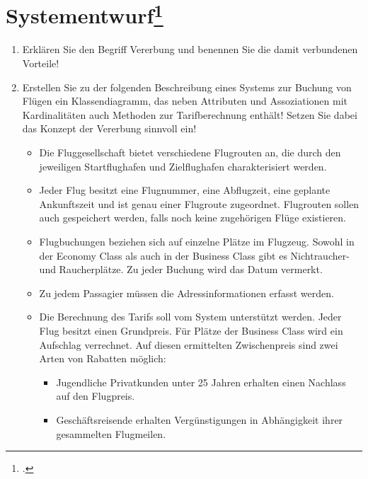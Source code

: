 \documentclass{lehramt-informatik}
\begin{document}
\section{Systementwurf\footcite{examen:66112:2006:09}}

\begin{enumerate}


\item Erklären Sie den Begriff Vererbung und benennen Sie die damit
verbundenen Vorteile!


\item Erstellen Sie zu der folgenden Beschreibung eines Systems zur
Buchung von Flügen ein Klassendiagramm, das neben Attributen und
Assoziationen mit Kardinalitäten auch Methoden zur Tarifberechnung
enthält! Setzen Sie dabei das Konzept der Vererbung sinnvoll ein!

\begin{itemize}
\item Die Fluggesellschaft bietet verschiedene Flugrouten an, die durch
den jeweiligen Startflughafen und Zielflughafen charakterisiert werden.

\item Jeder Flug besitzt eine Flugnummer, eine Abflugzeit, eine geplante
Ankunftszeit und ist genau einer Flugroute zugeordnet. Flugrouten sollen
auch gespeichert werden, falls noch keine zugehörigen Flüge existieren.

\item Flugbuchungen beziehen sich auf einzelne Plätze im Flugzeug.
Sowohl in der Economy Class als auch in der Business Class gibt es
Nichtraucher- und Raucherplätze. Zu jeder Buchung wird das Datum
vermerkt.

\item Zu jedem Passagier müssen die Adressinformationen erfasst werden.

\item Die Berechnung des Tarifs soll vom System unterstützt werden.
Jeder Flug besitzt einen Grundpreis. Für Plätze der Business Class wird
ein Aufschlag verrechnet. Auf diesen ermittelten Zwischenpreis sind zwei
Arten von Rabatten möglich:

\begin{itemize}
\item Jugendliche Privatkunden unter 25 Jahren erhalten einen Nachlass
auf den Flugpreis.

\item Geschäftsreisende erhalten Vergünstigungen in Abhängigkeit ihrer
gesammelten Flugmeilen.
\end{itemize}
\end{itemize}


\end{enumerate}
\end{document}
